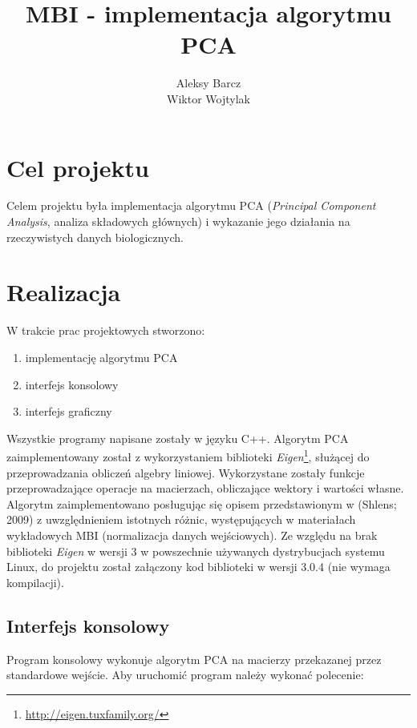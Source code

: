 \documentclass{article}
\begin{document}
\title{MBI - implementacja algorytmu PCA}
\author{Aleksy Barcz \\ Wiktor Wojtylak}

\maketitle

\section{Cel projektu}

Celem projektu była implementacja algorytmu PCA (\emph{Principal Component Analysis}, analiza składowych głównych) i wykazanie jego działania na rzeczywistych danych biologicznych.

\section{Realizacja}

W trakcie prac projektowych stworzono:

\begin{enumerate}

\item{implementację algorytmu PCA}
\item{interfejs konsolowy}
\item{interfejs graficzny}

\end{enumerate}

Wszystkie programy napisane zostały w języku C++. Algorytm PCA zaimplementowany został z wykorzystaniem biblioteki \emph{Eigen}\footnote{\url{http://eigen.tuxfamily.org/}}, służącej do przeprowadzania obliczeń algebry liniowej. Wykorzystane zostały funkcje przeprowadzające operacje na macierzach, obliczające wektory i wartości własne. Algorytm zaimplementowano posługując się opisem przedstawionym w (Shlens; 2009) z uwzględnieniem istotnych różnic, 
występujących w materiałach wykładowych MBI (normalizacja danych wejściowych). Ze względu na brak biblioteki \emph{Eigen} w wersji 3 w powszechnie używanych dystrybucjach systemu Linux, do projektu został załączony kod biblioteki w wersji 3.0.4 (nie wymaga kompilacji).

\subsection{Interfejs konsolowy}

Program konsolowy wykonuje algorytm PCA na macierzy przekazanej przez standardowe wejście. Aby uruchomić program należy wykonać polecenie:
\end{document}

